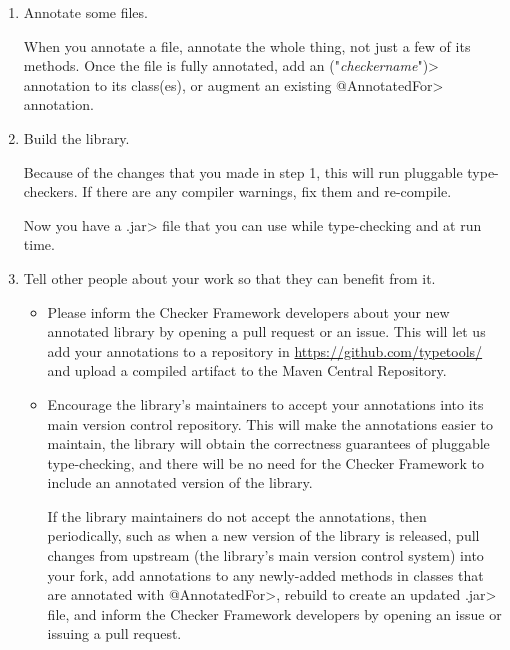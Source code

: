 \begin{enumerate}
\item Annotate some files.

  When you annotate a file, annotate the whole thing, not just a few of its
  methods.  Once the file is fully annotated, add an
  \<(\ttlcb"\emph{checkername}"\ttrcb)>
  annotation to its class(es), or augment an existing \<@AnnotatedFor>
  annotation.

\item
  Build the library.

  Because of the changes that you made in step 1, this will run pluggable
  type-checkers.  If there are any compiler warnings, fix them and re-compile.

  Now you have a \<.jar> file that you can use while type-checking and at
  run time.

\item
  Tell other people about your work so that they can benefit from it.

  \begin{itemize}
  \item
    Please inform the Checker Framework developers
    about your new annotated library by opening a pull request or an issue.
    This will let us add your annotations to a repository in
    \url{https://github.com/typetools/} and upload a compiled artifact to
    the Maven Central Repository.

  \item
    Encourage the library's maintainers to accept your annotations into its
    main version control repository.  This will make the annotations easier
    to maintain, the library will obtain the correctness guarantees of
    pluggable type-checking, and there will be no need for the Checker
    Framework to include an annotated version of the library.

    If the library maintainers do not accept the annotations, then
    periodically, such as when a new version of the library is released,
    pull changes from upstream (the library's main version control system)
    into your fork, add annotations to any newly-added methods in classes
    that are annotated with \<@AnnotatedFor>, rebuild to create an updated
    \<.jar> file, and inform the Checker Framework developers by opening an
    issue or issuing a pull request.
  \end{itemize}

\end{enumerate}


